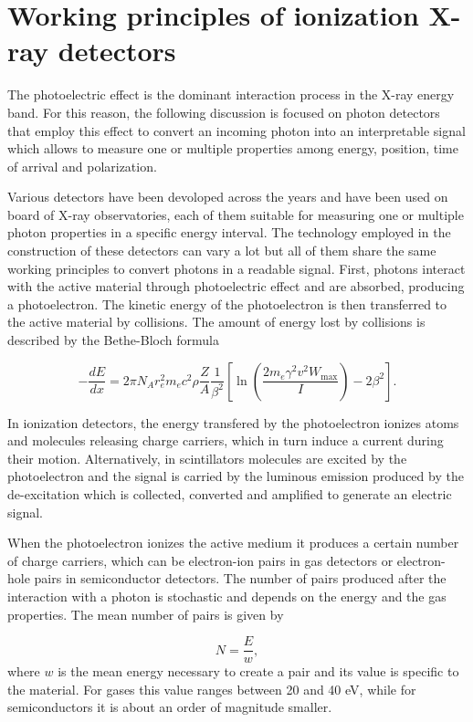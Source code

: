 \section{Working principles of ionization X-ray detectors}
The photoelectric effect is the dominant interaction process in the X-ray energy band. For this reason, the following discussion is focused on photon detectors that employ this effect to convert an incoming photon into an interpretable signal which allows to measure one or multiple properties among energy, position, time of arrival and polarization.

Various detectors have been devoloped across the years and have been used on board of X-ray observatories, each of them suitable for measuring one or multiple photon properties in a specific energy interval. The technology employed in the construction of these detectors can vary a lot but all of them share the same working principles to convert photons in a readable signal. First, photons interact with the active material through photoelectric effect and are absorbed, producing a photoelectron. The kinetic energy of the photoelectron is then transferred to the active material by collisions. The amount of energy lost by collisions is described by the Bethe-Bloch formula

\begin{equation}
- \frac{dE}{dx} = 2 \pi N_A r_e^2 m_e c^2 \rho \frac{Z}{A} \frac{1}{\beta^2} \left[ \ln \left( \frac{2 m_e \gamma^2 v^2 W_{\textrm{max}}}{I} \right) - 2\beta^2 \right].
\label{eq:bethe_bloch}
\end{equation}

In ionization detectors, the energy transfered by the photoelectron ionizes atoms and molecules releasing charge carriers, which in turn induce a current during their motion. Alternatively, in scintillators molecules are excited by the photoelectron and the signal is carried by the luminous emission produced by the de-excitation which is collected, converted and amplified to generate an electric signal. 

When the photoelectron ionizes the active medium it produces a certain number of charge carriers, which can be electron-ion pairs in gas detectors or electron-hole pairs in semiconductor detectors. The number of pairs produced after the interaction with a photon is stochastic and depends on the energy and the gas properties. The mean number of pairs is given by

\begin{equation}
N = \frac{E}{w},
\end{equation}
where $w$ is the mean energy necessary to create a pair and its value is specific to the material. For gases this value ranges between 20 and 40 eV, while for semiconductors it is about an order of magnitude smaller.

